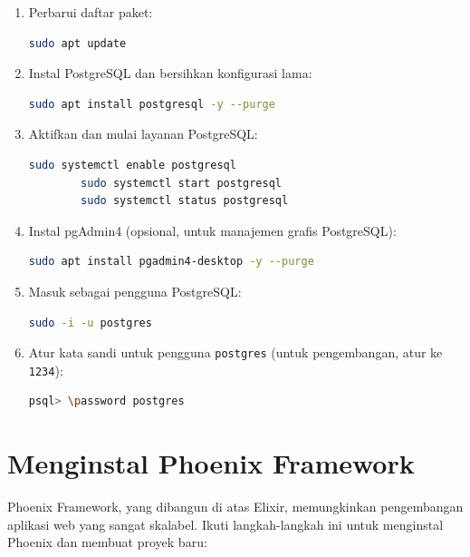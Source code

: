 \begin{enumerate}
	\item Perbarui daftar paket:
	\begin{lstlisting}[language=bash]
		sudo apt update
	\end{lstlisting}
	
	\item Instal PostgreSQL dan bersihkan konfigurasi lama:
	\begin{lstlisting}[language=bash]
		sudo apt install postgresql -y --purge
	\end{lstlisting}
	
	\item Aktifkan dan mulai layanan PostgreSQL:
	\begin{lstlisting}[language=bash]
		sudo systemctl enable postgresql
		sudo systemctl start postgresql
		sudo systemctl status postgresql
	\end{lstlisting}
	
	\item Instal pgAdmin4 (opsional, untuk manajemen grafis PostgreSQL):
	\begin{lstlisting}[language=bash]
		sudo apt install pgadmin4-desktop -y --purge
	\end{lstlisting}
	
	\item Masuk sebagai pengguna PostgreSQL:
	\begin{lstlisting}[language=bash]
		sudo -i -u postgres
	\end{lstlisting}
	
	\item Atur kata sandi untuk pengguna \texttt{postgres} (untuk pengembangan, atur ke \texttt{1234}):
	\begin{lstlisting}[language=bash]
		psql> \password postgres
	\end{lstlisting}
\end{enumerate}

\section{Menginstal Phoenix Framework}
Phoenix Framework, yang dibangun di atas Elixir, memungkinkan pengembangan aplikasi web yang sangat skalabel. Ikuti langkah-langkah ini untuk menginstal Phoenix dan membuat proyek baru:

